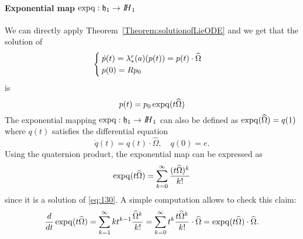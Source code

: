 \paragraph{Exponential map $\operatorname{expq} : \mathfrak h_1 \rightarrow \mbox{\rm $I\!\!H$}_1$}
We can directly apply Theorem~\ref{Theorem:solutionofLieODE} and we get that the solution of
\begin{equation}
  \label{eq:130}
  \begin{cases}
  \dot p(t) = \lambda^r_{*}(a)(p(t)) = p(t) \cdot \widehat \Omega \\
  p(0) = Rp_0
\end{cases}
\end{equation}
 is
\begin{equation}
  \label{eq:138}
  p(t) = p_0 \operatorname{expq}(t \widehat \Omega)
\end{equation}
The exponential mapping $\operatorname{expq} : \mathfrak h_1 \rightarrow \mbox{\rm $I\!\!H$}_1$ can also be defined as $\operatorname{expq}(\widehat \Omega) = q(1)$ where $q (t)$ satisfies the  differential equation
\begin{equation}
  \label{eq:235}
  \dot q(t) = q(t) \cdot \widehat \Omega , \quad q (0) = e.
\end{equation}
Using the quaternion product, the exponential map can be expressed as
\begin{equation}
  \label{eq:232}
  \operatorname{expq}(t \widehat \Omega ) = \sum_{k=0}^\infty \frac{(t\widehat \Omega)^k}{k!}
\end{equation}
since it is  a solution of \eqref{eq:130}. A simple computation allows to check this claim:
\begin{equation}
  \label{eq:233}
   \frac{d}{dt}\operatorname{expq}(t \widehat \Omega ) = \sum_{k=1}^\infty  k t^{k-1} \frac{ \widehat \Omega ^k}{k!} =  \sum_{k=0}^\infty  t^{k} \frac{t \widehat \Omega ^k}{k!}\cdot  \widehat \Omega  =   \operatorname{expq}(t \widehat \Omega ) \cdot \widehat \Omega.
\end{equation}

